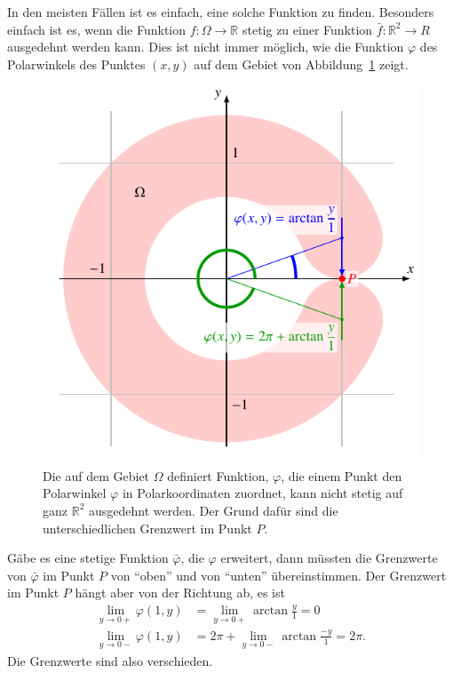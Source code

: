 In den meisten Fällen ist es einfach, eine solche Funktion zu
finden.
Besonders einfach ist es, wenn die Funktion $f\colon\Omega\to\mathbb R$
stetig zu einer Funktion $\bar{f}\colon\mathbb R^2\to R$ ausgedehnt
werden kann.
Dies ist nicht immer möglich, wie die Funktion $\varphi$ des Polarwinkels
des Punktes $(x,y)$ auf dem Gebiet von
Abbildung~\ref{buch:pde:figure:ringgebiet} zeigt.
%
\begin{figure}
\centering
\includegraphics{chapters/70-pde/images/ringgebiet.pdf}
\caption{Die auf dem Gebiet $\Omega$ definiert Funktion, $\varphi$,
die einem Punkt den Polarwinkel $\varphi$ in Polarkoordinaten zuordnet,
kann nicht stetig auf ganz $\mathbb R^2$ ausgedehnt werden.
%
Der Grund dafür sind die unterschiedlichen Grenzwert im Punkt $P$.
\label{buch:pde:figure:ringgebiet}}
\end{figure}
Gäbe es eine stetige Funktion $\bar{\varphi}$, die $\varphi$ erweitert, dann
müssten die Grenzwerte von $\bar{\varphi}$ im Punkt $P$ von ``oben'' und
von ``unten'' übereinstimmen.
Der Grenzwert im Punkt $P$ hängt aber von der Richtung ab,
es ist
\begin{align*}
\lim_{y\to 0+}\varphi(1,y) &= \lim_{y\to 0+}\arctan\frac{y}{1} = 0
\\
\lim_{y\to 0-}\varphi(1,y) &= 2\pi + \lim_{y\to 0-}\arctan\frac{-y}{1} = 2\pi.
\end{align*}
Die Grenzwerte sind also verschieden.

